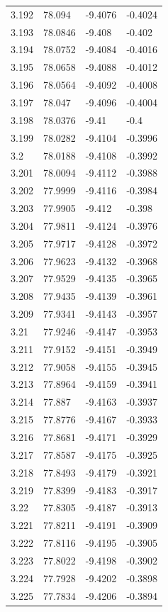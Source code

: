 \begin{tabular}{llll}
3.192 & 78.094 & -9.4076 & -0.4024 \\
3.193 & 78.0846 & -9.408 & -0.402 \\
3.194 & 78.0752 & -9.4084 & -0.4016 \\
3.195 & 78.0658 & -9.4088 & -0.4012 \\
3.196 & 78.0564 & -9.4092 & -0.4008 \\
3.197 & 78.047 & -9.4096 & -0.4004 \\
3.198 & 78.0376 & -9.41 & -0.4 \\
3.199 & 78.0282 & -9.4104 & -0.3996 \\
3.2 & 78.0188 & -9.4108 & -0.3992 \\
3.201 & 78.0094 & -9.4112 & -0.3988 \\
3.202 & 77.9999 & -9.4116 & -0.3984 \\
3.203 & 77.9905 & -9.412 & -0.398 \\
3.204 & 77.9811 & -9.4124 & -0.3976 \\
3.205 & 77.9717 & -9.4128 & -0.3972 \\
3.206 & 77.9623 & -9.4132 & -0.3968 \\
3.207 & 77.9529 & -9.4135 & -0.3965 \\
3.208 & 77.9435 & -9.4139 & -0.3961 \\
3.209 & 77.9341 & -9.4143 & -0.3957 \\
3.21 & 77.9246 & -9.4147 & -0.3953 \\
3.211 & 77.9152 & -9.4151 & -0.3949 \\
3.212 & 77.9058 & -9.4155 & -0.3945 \\
3.213 & 77.8964 & -9.4159 & -0.3941 \\
3.214 & 77.887 & -9.4163 & -0.3937 \\
3.215 & 77.8776 & -9.4167 & -0.3933 \\
3.216 & 77.8681 & -9.4171 & -0.3929 \\
3.217 & 77.8587 & -9.4175 & -0.3925 \\
3.218 & 77.8493 & -9.4179 & -0.3921 \\
3.219 & 77.8399 & -9.4183 & -0.3917 \\
3.22 & 77.8305 & -9.4187 & -0.3913 \\
3.221 & 77.8211 & -9.4191 & -0.3909 \\
3.222 & 77.8116 & -9.4195 & -0.3905 \\
3.223 & 77.8022 & -9.4198 & -0.3902 \\
3.224 & 77.7928 & -9.4202 & -0.3898 \\
3.225 & 77.7834 & -9.4206 & -0.3894 \\

\end{tabular}
